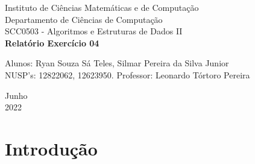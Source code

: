 \documentclass[a4paper, 12pt]{article}
\begin{document}

\begin{titlepage}
	\begin{center}
	

		\Huge{Instituto de Ciências Matemáticas e de Computação}\\
		\large{Departamento de Ciências de Computação}\\ 
		\large{SCC0503 - Algoritmos e Estruturas de Dados II}\\ 
		\vspace{15pt}
        \vspace{95pt}
        \textbf{\LARGE{Relatório Exercício 04}}\\
		\vspace{3,5cm}
	\end{center}
	
	\begin{flushleft}
		\begin{tabbing}
			Alunos: Ryan Souza Sá Teles, Silmar Pereira da Silva Junior \\
            NUSP's: 12822062, 12623950.
			Professor: Leonardo Tórtoro Pereira\\
	\end{tabbing}
 \end{flushleft}
	\vspace{1cm}
	
	\begin{center}
		\vspace{\fill}
			 Junho\\
		 2022
			\end{center}
\end{titlepage}

\newpage
\newpage
\tableofcontents
\thispagestyle{empty}

\newpage
{}
\section{Introdução}
\end{document}
